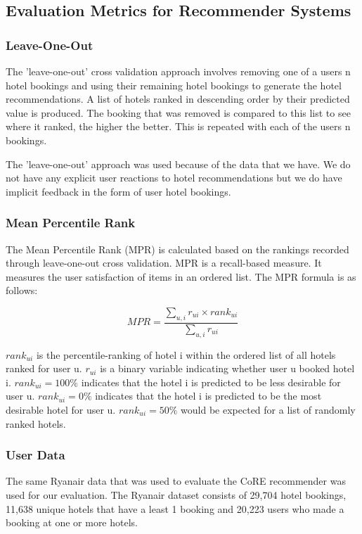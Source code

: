 \subsection{Evaluation Metrics for Recommender Systems}
\subsubsection{Leave-One-Out}
The 'leave-one-out' cross validation approach involves removing one of a users n hotel bookings and using their remaining hotel bookings to generate the hotel recommendations. A list of hotels ranked in descending order by their predicted value is produced. The booking that was removed is compared to this list to see where it ranked, the higher the better. This is repeated with each of the users n bookings.

The 'leave-one-out' approach was used because of the data that we have. We do not have any explicit user reactions to hotel recommendations but we do have implicit feedback in the form of user hotel bookings.

\subsubsection{Mean Percentile Rank}
The Mean Percentile Rank (MPR) is calculated based on the rankings recorded through leave-one-out cross validation. MPR is a recall-based measure. It measures the user satisfaction of items in an ordered list. The MPR formula is as follows:

\begin{equation}
    MPR = \frac{ \sum_{u,i} r_{ui} \times rank_{ui} } {\sum_{u,i} r_{ui}}
\end{equation}

$rank_{ui}$ is the percentile-ranking of hotel i within the ordered list of all hotels ranked for user u. $r_{ui}$ is a binary variable indicating whether user u booked hotel i. $rank_{ui} = 100\%$ indicates that the hotel i is predicted to be less desirable for user u. $rank_{ui} = 0\%$ indicates that the hotel i is predicted to be the most desirable hotel for user u. $rank_{ui} = 50\%$ would be expected for a list of randomly ranked hotels.

\subsubsection{User Data}
The same Ryanair data that was used to evaluate the CoRE recommender was used for our evaluation. The Ryanair dataset consists of 29,704 hotel bookings, 11,638 unique hotels that have a least 1 booking and 20,223 users who made a booking at one or more hotels.

